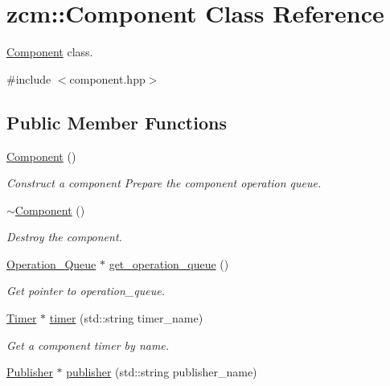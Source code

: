 \hypertarget{classzcm_1_1Component}{}\section{zcm\+:\+:Component Class Reference}
\label{classzcm_1_1Component}


\hyperlink{classzcm_1_1Component}{Component} class.  




{\ttfamily \#include $<$component.\+hpp$>$}

\subsection*{Public Member Functions}
\begin{DoxyCompactItemize}
\item 
\hyperlink{classzcm_1_1Component_a6fd6b1f309a6b464a14c22a94d18f040}{Component} ()
\begin{DoxyCompactList}\small\item\em Construct a component Prepare the component operation queue. \end{DoxyCompactList}\item 
\hyperlink{classzcm_1_1Component_a0bab6bb89e49affa281179f5d6aeff6a}{$\sim$\+Component} ()
\begin{DoxyCompactList}\small\item\em Destroy the component. \end{DoxyCompactList}\item 
\hyperlink{classzcm_1_1Operation__Queue}{Operation\+\_\+\+Queue} $\ast$ \hyperlink{classzcm_1_1Component_a1180421a4287752b04db9dc00399605d}{get\+\_\+operation\+\_\+queue} ()
\begin{DoxyCompactList}\small\item\em Get pointer to operation\+\_\+queue. \end{DoxyCompactList}\item 
\hyperlink{classzcm_1_1Timer}{Timer} $\ast$ \hyperlink{classzcm_1_1Component_ade89bc05fd836ccb7951047cc35c277d}{timer} (std\+::string timer\+\_\+name)
\begin{DoxyCompactList}\small\item\em Get a component timer by name. \end{DoxyCompactList}\item 
\hyperlink{classzcm_1_1Publisher}{Publisher} $\ast$ \hyperlink{classzcm_1_1Component_a706edac99bd6b40210fba3e8253acef3}{publisher} (std\+::string publisher\+\_\+name)

\end{DoxyCompactItemize}
